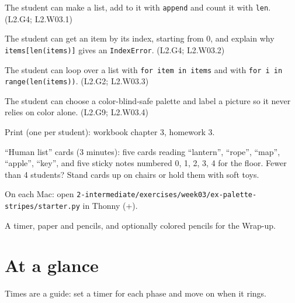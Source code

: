 
\begin{objectives}
  \item The student can make a list, add to it with \texttt{append} and count it with \texttt{len}. (L2.G4; L2.W03.1)
  \item The student can get an item by its index, starting from 0, and explain why \texttt{items[len(items)]} gives an \texttt{IndexError}. (L2.G4; L2.W03.2)
  \item The student can loop over a list with \texttt{for item in items} and with \texttt{for i in range(len(items))}. (L2.G2; L2.W03.3)
  \item The student can choose a color-blind-safe palette and label a picture so it never relies on color alone. (L2.G9; L2.W03.4)
\end{objectives}

\begin{materials}
  \item Print (one per student): workbook chapter 3, homework 3.
  \item \enquote{Human list} cards (3 minutes): five cards reading \enquote{lantern}, \enquote{rope}, \enquote{map}, \enquote{apple}, \enquote{key},
        and five sticky notes numbered 0, 1, 2, 3, 4 for the floor. Fewer than 4 students? Stand cards up on chairs or hold them with soft toys.
  \item On each Mac: open \texttt{2-intermediate/exercises/week03/ex-palette-stripes/starter.py} in Thonny (+).
  \item A timer, paper and pencils, and optionally colored pencils for the Wrap-up.
\end{materials}

\section{At a glance}
Times are a guide: set a timer for each phase and move on when it rings.
\begin{timeplan}
\end{timeplan}

